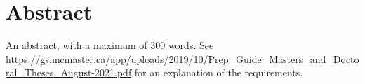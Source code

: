 \chapter{Abstract}
\label{chap:abstract}

An abstract, with a maximum of 300 words. See
\url{https://gs.mcmaster.ca/app/uploads/2019/10/Prep_Guide_Masters_and_Doctoral_Theses_August-2021.pdf}
for an explanation of the requirements.

